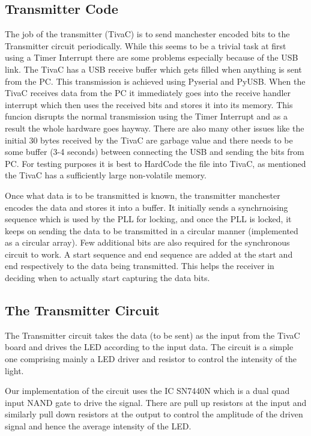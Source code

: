 \documentclass{article}
\begin{document}
\subsection{Transmitter Code}
The job of the transmitter (TivaC) is to send manchester encoded bits to the Transmitter circuit periodically. While this seems to be a trivial task at first using a Timer Interrupt there are some problems especially because of the USB link. The TivaC has a USB receive buffer which gets filled when anything is sent from the PC. This transmission is achieved using Pyserial and PyUSB. When the TivaC receives data from the PC it immediately goes into the receive handler interrupt which then uses the received bits and stores it into its memory. This funcion disrupts the normal transmission using the Timer Interrupt and as a result the whole hardware goes hayway. There are also many other issues like the initial 30 bytes received by the TivaC are garbage value and there needs to be some buffer (3-4 seconds) between connecting the USB and sending the bits from PC. For testing purposes it is best to HardCode the file into TivaC, as mentioned the TivaC has a sufficiently large non-volatile memory.

Once what data is to be transmitted is known, the transmitter manchester encodes the data and stores it into a buffer. It initially sends a synchrnoising sequence which is used by the PLL for locking, and once the PLL is locked, it keeps on sending the data to be transmitted in a circular manner (implemented as a circular array). Few additional bits are also required for the synchronous circuit to work. A start sequence and end sequence are added at the start and end respectively to the data being transmitted. This helps the receiver in deciding when to actually start capturing the data bits. 
\subsection{The Transmitter Circuit}
The Transmitter circuit takes the data (to be sent) as the input from the TivaC board and drives the LED according to the input data. The circuit is a simple one comprising mainly a LED driver  and resistor to control the intensity of the light.

Our implementation of the circuit uses the IC SN7440N which is a dual quad input NAND gate to drive the signal. There are pull up resistors at the input and similarly pull down resistors at the output to control the amplitude of the driven signal and hence the average intensity of the LED.
\end{document}
